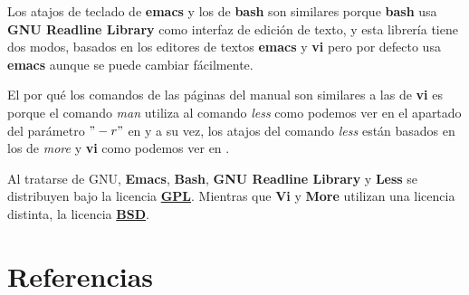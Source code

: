 \documentclass[paper=a4, fontsize=11pt]{scrartcl} %
\numberwithin{equation}{section} %
\numberwithin{figure}{section} %
\numberwithin{table}{section} %
\begin{document}
\begin{enumerate}
		Los atajos de teclado de \textbf{emacs} y los de \textbf{bash} son similares porque \textbf{bash}
		\cite{man_bash} usa \textbf{GNU Readline Library}\cite{GNURL} como interfaz de edición de texto,
		y esta librería tiene dos modos, basados en los editores de textos \textbf{emacs} y \textbf{vi}
		pero por defecto usa \textbf{emacs} aunque se puede cambiar fácilmente.
		
		El por qué los comandos de las páginas del manual son similares a las de \textbf{vi} es porque
		el comando \textit{man} utiliza al comando \textit{less} como podemos ver en el apartado del
		parámetro $"-r"$ en \cite{man_man} y a su vez, los atajos del comando \textit{less} están
		basados en los de \textit{more} y \textbf{vi} como podemos ver en \cite{man_less}.
		
		Al tratarse de GNU, \textbf{Emacs}, \textbf{Bash}, \textbf{GNU Readline Library} y \textbf{Less}
		se distribuyen bajo la licencia \href{https://www.gnu.org/licenses/gpl.html}{\textbf{GPL}}.
		Mientras que \textbf{Vi} y \textbf{More} utilizan una licencia distinta, la licencia
		\href{http://www.freebsd.org/copyright/license.html}{\textbf{BSD}}.
		
		
\end{enumerate}

\newpage
\section{Referencias}

\end{document}
